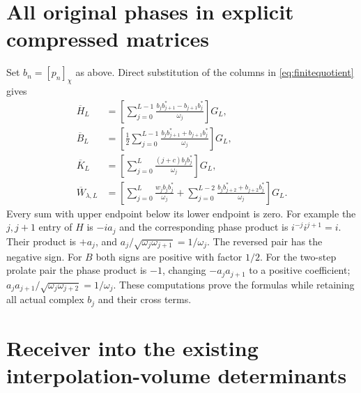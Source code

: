 \documentclass[11pt]{article}
\begin{document}
\section{All original phases in explicit compressed matrices}

Set $b_n=[p_n]_\chi$ as above. Direct substitution of
the columns in \eqref{eq:finitequotient} gives
\begin{equation}\label{eq:explicitcompressed}
 \begin{aligned}
 \overline H_L
 &=\left[\sum_{j=0}^{L-1}
       \frac{b_jb_{j+1}^*-b_{j+1}b_j^*}{\omega_j}\right]G_L,\\
 \overline B_L
 &=\left[\frac12\sum_{j=0}^{L-1}
       \frac{b_jb_{j+1}^*+b_{j+1}b_j^*}{\omega_j}\right]G_L,\\
 \overline K_L
 &=\left[\sum_{j=0}^L
                  \frac{(j+c)b_jb_j^*}{\omega_j}\right]G_L,\\
 \overline W_{\lambda,L}
 &=\left[\sum_{j=0}^L\frac{w_jb_jb_j^*}{\omega_j}
      +\sum_{j=0}^{L-2}
             \frac{b_jb_{j+2}^*+b_{j+2}b_j^*}{\omega_j}\right]G_L.
 \end{aligned}
\end{equation}
Every sum with upper endpoint below its lower endpoint
is zero. For example the $j,j+1$ entry of $H$ is
$-ia_j$ and the corresponding phase product is
$i^{-j}i^{j+1}=i$. Their product is $+a_j$,
and $a_j/\sqrt{\omega_j\omega_{j+1}}=1/\omega_j$.
The reversed pair has the negative sign. For $B$
both signs are positive with factor $1/2$.
For the two-step prolate pair the phase product is
$-1$, changing $-a_ja_{j+1}$ to a positive coefficient;
$a_ja_{j+1}/\sqrt{\omega_j\omega_{j+2}}=1/\omega_j$.
These computations prove the formulas while retaining
all actual complex $b_j$ and their cross terms.

\section{Receiver into the existing interpolation-volume determinants}
\end{document}
